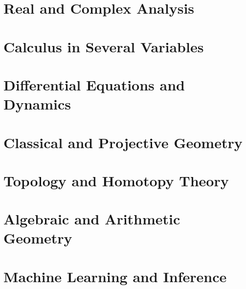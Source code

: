 

\part{Real and Complex Analysis}
\label{vol:07-real-and-complex-analysis}
\begingroup
\small
\sloppy
\parttoc
\endgroup



\part{Calculus in Several Variables}
\label{vol:08-calculus-in-several-variables}
\begingroup
\small
\sloppy
\parttoc
\endgroup



\part{Differential Equations and Dynamics}
\label{vol:09-differential-equations-and-dynamics}
\begingroup
\small
\sloppy
\parttoc
\endgroup



\part{Classical and Projective Geometry}
\label{vol:10-classical-and-projective-geometry}
\begingroup
\small
\sloppy
\parttoc
\endgroup



\part{Topology and Homotopy Theory}
\label{vol:11-topology-and-homotopy-theory}
\begingroup
\small
\sloppy
\parttoc
\endgroup



\part{Algebraic and Arithmetic Geometry}
\label{vol:12-algebraic-and-arithmetic-geometry}
\begingroup
\small
\sloppy
\parttoc
\endgroup



\part{Machine Learning and Inference}
\label{vol:13-machine-learning-and-inference}
\begingroup
\small
\sloppy
\parttoc
\endgroup


